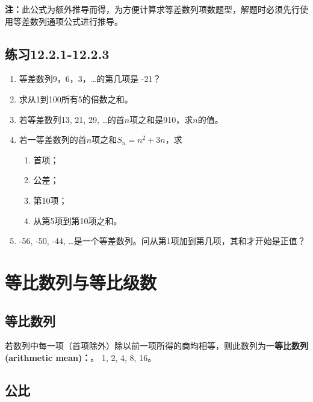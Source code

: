 \documentclass[9pt]{article}
\begin{document}
\begin{multicols}{2}
\begin{small}
        \noindent\textbf{注：}此公式为额外推导而得，为方便计算求等差数列项数题型，解题时必须先行使用等差数列通项公式进行推导。

        \subsection*{练习12.2.1-12.2.3}

        \begin{enumerate}

            \item 等差数列9，6，3，\ldots 的第几项是 -21？

            \item 求从1到100所有5的倍数之和。

            \item 若等差数列13, 21, 29, \ldots 的首$n$项之和是910，求$n$的值。

            \item 若一等差数列的首$n$项之和$S_n = n^2 + 3n$，求
                  \begin{enumerate}
                      \item 首项；
                      \item 公差；
                      \item 第10项；
                      \item 从第5项到第10项之和。
                  \end{enumerate}

            \item -56, -50, -44, \ldots 是一个等差数列。问从第1项加到第几项，其和才开始是正值？

        \end{enumerate}

        \section{等比数列与等比级数}

        \subsection{等比数列}

        若数列中每一项（首项除外）除以前一项所得的商均相等，则此数列为一\textbf{等比数列(arithmetic mean)：}。
        \example{}1, 2, 4, 8, 16。

        \subsection{公比}


\end{small}
\end{multicols}
\end{document}
